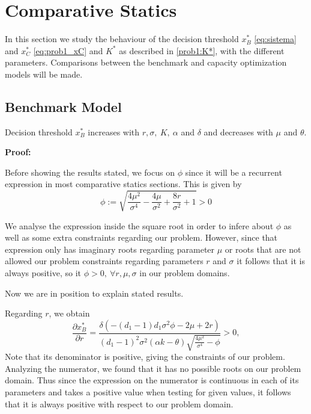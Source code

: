 

\section{Comparative Statics}
\label{prob1:cs}

In this section we study the behaviour of the decision threshold $x^*_B$ \eqref{eq:sistema} and $x^*_{C}$ \eqref{eq:prob1_xC} and $K^*$ as described in \eqref{prob1:K*}, with
the different parameters. Comparisons between the benchmark and capacity optimization models will be made.


\subsection{Benchmark Model}

\begin{prop}
	\label{1_prop1}
Decision threshold $x^*_B$ increases with $r, \sigma, \ K, \ \alpha$ and  $\delta$ and decreases with $\mu$ and $\theta$.
\end{prop}

\textbf{Proof:}

Before showing the results stated, we focus on $\phi$ since it will be a recurrent expression in most comparative statics sections. This is given by
\begin{equation}
\phi:=\sqrt{\frac{4 \mu ^2}{\sigma ^4}-\frac{4 \mu }{\sigma ^2}+\frac{8 r}{\sigma ^2}+1}>0
\label{phi}
\end{equation}

We analyse the expression inside the square root in order to infere about $\phi$ as well as some extra constraints regarding our problem. However, since that expression only has imaginary roots regarding parameter $\mu$ or roots that are not allowed our problem constraints regarding parameters $r$ and $\sigma$ it follows that it is always positive, so it $\phi>0, \ \forall r, \mu, \sigma$ in our problem domains.	

Now we are in position to explain stated results.

Regarding $r$, we obtain
$$\frac{\partial x^*_B}{\partial r}=\frac{\delta  \left(-(d_1-1) d_1 \sigma ^2 \phi-2 \mu +2 r \right)}{(d_1-1)^2 \sigma ^2 (\alpha  k-\theta ) \sqrt{\frac{4 \mu ^2}{\sigma ^4}-\phi}}>0,$$
Note that its denominator is positive, giving the constraints of our problem.
Analyzing the numerator, we found that it has no possible roots on our problem domain. Thus since the expression on the numerator is continuous in each of its parameters and takes a positive value when testing for given values, it follows that it is always positive with respect to our problem domain.

